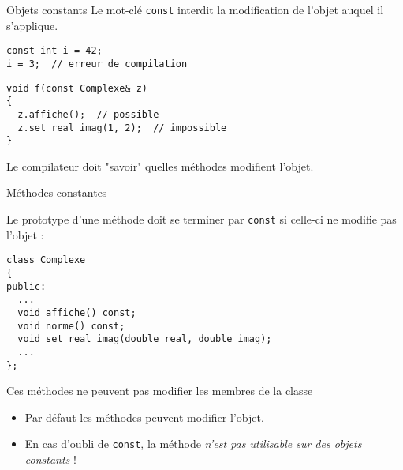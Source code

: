 \documentclass[c]{beamer}
\newcommand{\inline}[1]{\texttt{#1}}
\begin{document}
\begin{frame}[fragile]{Objets constants}
Le mot-clé \inline{const} interdit la modification de l'objet auquel il s'applique.
\vspace{1em}

\begin{verbatim}
const int i = 42;
i = 3;  // erreur de compilation
\end{verbatim}

\vspace{1em}
\pause
\begin{verbatim}
void f(const Complexe& z)
{
  z.affiche();  // possible
  z.set_real_imag(1, 2);  // impossible
}
\end{verbatim}

\pause

Le compilateur doit "savoir" quelles méthodes modifient l'objet.
\end{frame}


\begin{frame}[fragile]{Méthodes constantes}

\def\theFancyVerbLine{%
  \color{white}\sffamily\tiny\arabic{FancyVerbLine}%
        {\tikz[remember picture,overlay]\node(minted-\arabic{FancyVerbLine}){};}%
}

Le prototype d'une méthode doit se terminer par \inline{const} si celle-ci ne modifie pas l'objet :
\vspace{1em}

\begin{verbatim}
class Complexe
{
public:
  ...
  void affiche() const;
  void norme() const;
  void set_real_imag(double real, double imag);
  ...
};
\end{verbatim}

\pause
\begin{cbox}[6][lbtuc][\centering\small][9][5]
 Ces méthodes ne peuvent pas modifier les membres de la classe
\end{cbox}

\begin{itemize}
\item Par défaut les méthodes peuvent modifier l'objet.
\item En cas d'oubli de \inline{const}, la méthode \emph{n'est pas utilisable sur des objets constants} !
\end{itemize}
\end{frame}
\end{document}

